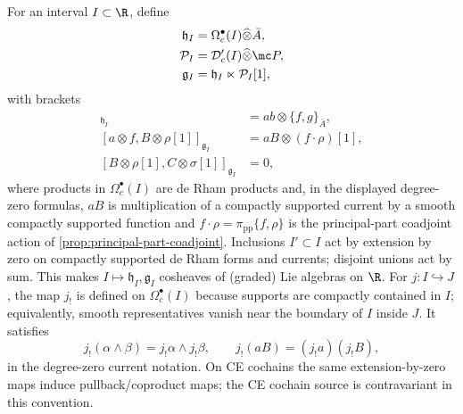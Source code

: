 \documentclass[11pt]{memoir}
\begin{document}
\begin{constr}\label{constr:interval-fact-algebras}
  For an interval $I\subset\R$, define
  \begin{align*}
    \mathfrak h_I&=\Omega_c^\bullet(I)\widehat\otimes\bar A,\\
    \mathcal P_I&=\mathcal D'_c(I)\widehat\otimes\mc P,\\
    \mathfrak g_I&=\mathfrak h_I\ltimes\mathcal P_I[1],
  \end{align*}
  with brackets
  \begin{align*}
    [a\otimes f,b\otimes g]_{\mathfrak h_I}&=ab\otimes\{f,g\}_{\bar A},\\
    [a\otimes f,B\otimes\rho[1]]_{\mathfrak g_I}&=aB\otimes(f\cdot\rho)[1],\\
    [B\otimes\rho[1],C\otimes\sigma[1]]_{\mathfrak g_I}&=0,
  \end{align*}
  where products in $\Omega_c^\bullet(I)$ are de Rham products and, in
  the displayed degree-zero formulas, $aB$ is multiplication of a
  compactly supported current by a smooth compactly supported function and
  $f\cdot\rho=\pi_{\mathrm{pp}}\{f,\rho\}$ is the principal-part
  coadjoint action of \ref{prop:principal-part-coadjoint}. Inclusions
  $I'\subset I$ act by extension by zero on compactly supported de Rham
  forms and currents; disjoint unions act by sum. This makes
  $I\mapsto\mathfrak h_I,\mathfrak g_I$ cosheaves of (graded) Lie
  algebras on $\R$. For \(j:I\hookrightarrow J\), the map \(j_!\) is
  defined on \(\Omega_c^\bullet(I)\) because supports are compactly
  contained in \(I\); equivalently, smooth representatives vanish near
  the boundary of \(I\) inside \(J\). It satisfies
  \[
    j_!(\alpha\wedge\beta)=j_!\alpha\wedge j_!\beta,\qquad
    j_!(aB)=(j_!a)(j_!B),
  \]
  in the degree-zero current notation. On CE cochains the same
  extension-by-zero maps induce pullback/coproduct maps; the CE cochain
  source is contravariant in this convention.


\end{constr}
\end{document}

